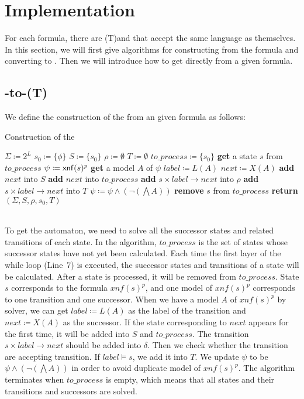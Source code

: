 \section{Implementation}\label{sec:algorithm}
For each \ltlf formula, there are (T)\NFA and \DFA that accept the same language as themselves. In this section, we will first give algorithms for constructing \TNFA from the \ltlf formula and converting \TNFA to \NFA. Then we will introduce how to get \TDFA directly from a given \ltlf formula.

\subsection{\ltlf-to-(T)\NFA}
We define the construction of the \TNFA from an given \ltlf formula as follows: 

\begin{algorithm}[H] \label{algo:TNFAconstruct}
  \caption{Construction of the \TNFA}
  \LinesNumbered
  $\Sigma\coloneqq 2^L$\;
  $s_0\coloneqq\{\phi\}$\;
  $S\coloneqq\{s_0\}$\;
  $\rho\coloneqq\emptyset$\;
  $T\coloneqq\emptyset$\;
  $to\_process\coloneqq\{s_0\}$\;
  {
    \textbf{get} a state $s$ from $to\_process$\;
    $\psi\coloneqq{\sf xnf}(s)^p$\;
    {
      \textbf{get} a model $A$ of $\psi$\;
      $label\coloneqq L(A)$\;
      $next\coloneqq X(A)$\;
      {
        \textbf{add} $next$ into $S$\;
        \textbf{add} $next$ into $to\_process$\;
      }
       \textbf{add} $s\times label\to next$ into $\rho$\;
      {
        \textbf{add} $s\times label\to next$ into $T$\;
      }
       $\psi\coloneqq \psi\land(\neg(\bigwedge A))$\;
    }
    \textbf{remove} $s$ from $to\_process$\;
  }
  \textbf{return} $(\Sigma,S,\rho,s_0,T)$\;
\end{algorithm}
~\\
To get the automaton, we need to solve all the successor states and related transitions of each state. In the algorithm, $to\_process$ is the set of states whose successor states have not yet been calculated. Each time the first layer of the while loop (Line~7) is executed, the successor states and transitions of a state will be calculated. After a state is processed, it will be removed from $to\_process$. State $s$ corresponds to the formula $xnf(s)^p$, and one model of $xnf(s)^p$ corresponds to one transition and one successor. When we have a model $A$ of $xnf(s)^p$ by \SAT solver, we can get $label\coloneqq L(A)$ as the label of the transition and $next\coloneqq X(A)$ as the successor. If the state corresponding to $next$ appears for the first time, it will be added into $S$ and $to\_process$. The transition $s\times label\to next$ should be added into $\delta$. Then we check whether the transition are accepting transition. If $label\models s$, we add it into $T$. We update $\psi$ to be $\psi\land(\neg(\bigwedge A))$ in order to avoid duplicate model of $xnf(s)^p$. The algorithm terminates when $to\_process$ is empty, which means that all states and their transitions and successors are solved.


